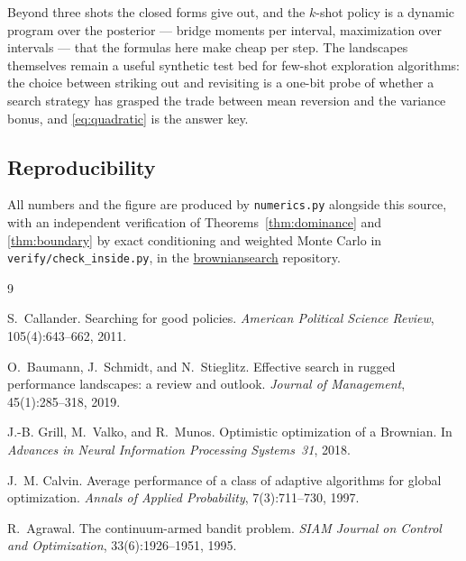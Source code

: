 \documentclass[11pt]{article}
\theoremstyle{itheads}
\begin{document}
Beyond three shots the closed forms give out, and the $k$-shot policy is
a dynamic program over the posterior --- bridge moments per interval,
maximization over intervals --- that the formulas here make cheap per
step. The landscapes themselves remain a useful synthetic test bed for
few-shot exploration algorithms: the choice between striking out and
revisiting is a one-bit probe of whether a search strategy has grasped the
trade between mean reversion and the variance bonus, and
\eqref{eq:quadratic} is the answer key.

\subsection*{Reproducibility}

All numbers and the figure are produced by
\texttt{numerics.py} alongside this source, with an independent
verification of Theorems~\ref{thm:dominance} and \ref{thm:boundary}
by exact conditioning and weighted Monte Carlo in
\texttt{verify/check\_inside.py}, in the
\href{https://github.com/microprediction/browniansearch}{browniansearch}
repository.

\begin{thebibliography}{9}

S.~Callander.
Searching for good policies.
\emph{American Political Science Review}, 105(4):643--662, 2011.

O.~Baumann, J.~Schmidt, and N.~Stieglitz.
Effective search in rugged performance landscapes: a review and outlook.
\emph{Journal of Management}, 45(1):285--318, 2019.

J.-B. Grill, M.~Valko, and R.~Munos.
Optimistic optimization of a Brownian.
In \emph{Advances in Neural Information Processing Systems~31}, 2018.

J.~M. Calvin.
Average performance of a class of adaptive algorithms for global
optimization.
\emph{Annals of Applied Probability}, 7(3):711--730, 1997.

R.~Agrawal.
The continuum-armed bandit problem.
\emph{SIAM Journal on Control and Optimization}, 33(6):1926--1951, 1995.

\end{thebibliography}
\end{document}
